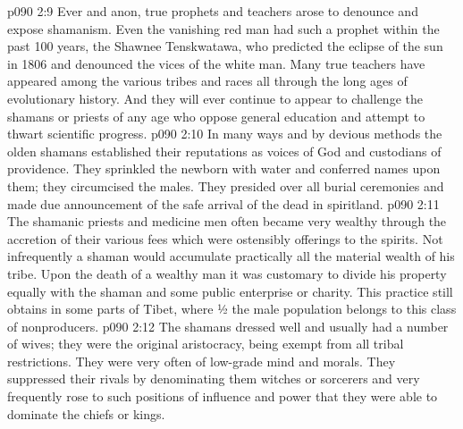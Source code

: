 \vs p090 2:9 Ever and anon, true prophets and teachers arose to denounce and expose shamanism. Even the vanishing red man had such a prophet within the past 100 years, the Shawnee Tenskwatawa, who predicted the eclipse of the sun in 1806 and denounced the vices of the white man. Many true teachers have appeared among the various tribes and races all through the long ages of evolutionary history. And they will ever continue to appear to challenge the shamans or priests of any age who oppose general education and attempt to thwart scientific progress.
\vs p090 2:10 In many ways and by devious methods the olden shamans established their reputations as voices of God and custodians of providence. They sprinkled the newborn with water and conferred names upon them; they circumcised the males. They presided over all burial ceremonies and made due announcement of the safe arrival of the dead in spiritland.
\vs p090 2:11 The shamanic priests and medicine men often became very wealthy through the accretion of their various fees which were ostensibly offerings to the spirits. Not infrequently a shaman would accumulate practically all the material wealth of his tribe. Upon the death of a wealthy man it was customary to divide his property equally with the shaman and some public enterprise or charity. This practice still obtains in some parts of Tibet, where ½ the male population belongs to this class of nonproducers.
\vs p090 2:12 The shamans dressed well and usually had a number of wives; they were the original aristocracy, being exempt from all tribal restrictions. They were very often of low\hyp{}grade mind and morals. They suppressed their rivals by denominating them witches or sorcerers and very frequently rose to such positions of influence and power that they were able to dominate the chiefs or kings.

